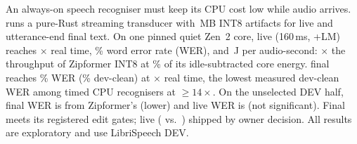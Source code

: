 An always-on speech recogniser must keep its CPU cost low while audio arrives.
\ultra{} runs a pure-Rust streaming transducer with \ColdHeadModel\,MB INT8 artifacts for live and utterance-end
final text. On one pinned quiet Zen~2 core, \ultra{} live (160\,ms, +LM) reaches
\ColdLiveSpeed$\times$ real time, \ColdLiveWer\% word error rate (WER), and
\ColdLiveWatts\,J per audio-second: \VsSpeedXOne$\times$ the throughput of Zipformer INT8 at \VsEnergyPctOne\% of
its idle-subtracted core energy.
\ultra{} final reaches \ColdHeadWer\% WER (\FinPanelClean\% dev-clean) at \ColdHeadSpeed$\times$ real time,
the lowest measured dev-clean WER among timed CPU recognisers at $\geq 14\times$.
On the unselected DEV half, final WER is \FinCZipDelta\pp from Zipformer's (lower) and live WER is
\LookLiveCZipDelta\pp (not significant). Final meets its registered edit gates; live
(\LookLivePanelEdits{} vs.\ \CandGateLivePanel) shipped by owner decision. All results are exploratory and use LibriSpeech DEV.
